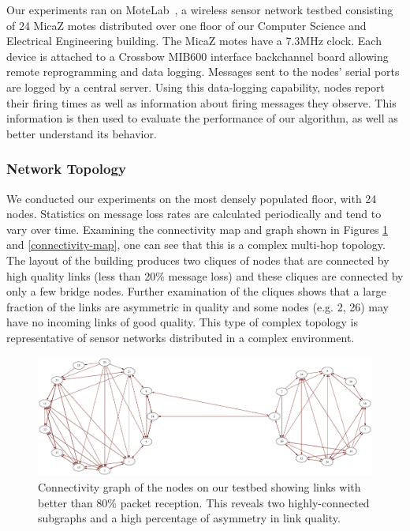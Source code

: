 \documentclass{sig-alternate}
\begin{document}
{Our experiments ran on MoteLab~\cite{motelab-spots05-abbrv}, a
wireless sensor network testbed consisting of 24 MicaZ motes
distributed over one floor of our Computer Science and Electrical
Engineering building. The MicaZ motes have a 7.3MHz clock. Each device
is attached to a Crossbow MIB600 interface backchannel board allowing
remote reprogramming and data logging. Messages sent to the nodes'
serial ports are logged by a central server. Using this data-logging
capability, nodes report their firing times as well as information
about firing messages they observe. This information is then used to
evaluate the performance of our algorithm, as well as better
understand its behavior.

\subsubsection{Network Topology}
\label{sec-FTSP}
We conducted our experiments on the most densely populated floor, with
24 nodes. Statistics on message loss rates are calculated periodically
and tend to vary over time. Examining the connectivity map and graph
shown in Figures \ref{connectivity-graph} and \ref{connectivity-map},
one can see that this is a complex multi-hop topology. The layout of
the building produces two cliques of nodes that are connected by high
quality links (less than 20\% message loss) and these cliques are
connected by only a few bridge nodes. Further examination of the
cliques shows that a large fraction of the links are asymmetric in
quality and some nodes (e.g. 2, 26) may have no incoming links of good
quality. This type of complex topology is representative of sensor
networks distributed in a complex environment.



\begin{figure}[t]
\begin{center}
\includegraphics[width=0.8\hsize]{figures/threshold-motelab-0200-e.pdf}
\end{center}
\caption{Connectivity graph of the nodes on our testbed showing links
with better than 80\% packet reception. This reveals two
highly-connected subgraphs and a high percentage of asymmetry in link
quality.}
\label{connectivity-graph}
\end{figure}




}
\end{document}
